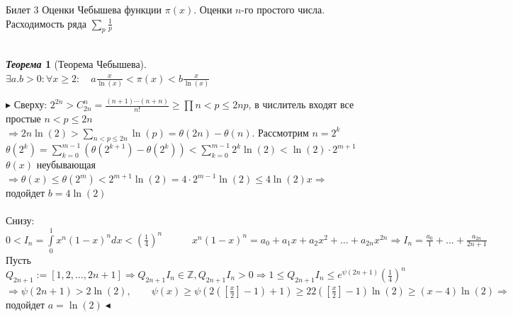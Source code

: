 \documentclass[a4paper,12pt]{article}
\newtheorem{teo}{\textit{Теорема}}
\newcommand{\TE}{\theta}
\newcommand{\SI}{\psi}
\newcommand{\q}{\quad}
\newcommand{\pb}{\blacktriangleright}
\newcommand{\pe}{\blacktriangleleft}
\newcommand{\Ra}{\Rightarrow}
\newcommand{\bb}[1]{\mathbb{#1}}
\newcommand{\SL}{\sum\limits}
\newcommand{\IL}{\int\limits}
\newcommand{\os}{\left(}
\newcommand{\cs}{\right)}
\begin{document}
\newpage
\begin{mybox}{\hypertarget{bil3}{Билет 3}}
Оценки Чебышева функции $\pi(x)$. Оценки $n$-го простого числа. Расходимость ряда $\sum_p \frac{1}{p}$\q\\\q\\
\begin{teo}[Теорема Чебышева]\q\\
$\exists a.b > 0: \forall x \ge 2:\q a\frac{x}{\ln(x)} <\pi(x) <b\frac{x}{\ln(x)} $
\end{teo}
$\pb$ Сверху: $2^{2n} > C_{2n}^n = \frac{(n+1)\cdots(n+n)}{n!}\ge \prod\limits{n<p\le 2n} p $, в числитель входят все простые $n < p \le 2n$\\
$\Ra 2n\ln(2) > \SL_{n < p \le 2n}\ln(p) = \TE(2n) - \TE(n) $. Рассмотрим $n = 2^k$\\
$\TE(2^k) = \SL_{k=0}^{m-1} (\TE(2^{k+1}) - \TE(2^k)) < \SL_{k=0}^{m-1} 2^k\ln(2) < \ln(2)  \cdot 2^{m+1}  $\\
$\TE(x)$ неубывающая $\Ra \TE(x) \le \TE(2^m)< 2^{m+1} \ln(2) = 4 \cdot 2^{m-1}\ln(2) \le 4\ln(2)x\Ra  $ подойдет $b = 4\ln(2)$\\\q\\
Снизу:$0 < I_n = \IL_0^1 x^n(1-x)^n dx< \os \frac{1}{4} \cs^n\q\q\q x^n(1-x)^n = a_0 + a_1x + a_2x^2 +\dots +a_{2n}x^{2n}\Ra I_n = \frac{a_0}{1} + \dots + \frac{a_{2n}}{2n+1}  $\\
Пусть $Q_{2n+1} := [1,2,\dots, 2n+1]\Ra Q_{2n+1}I_n\in \bb{Z}  , Q_{2n+1}I_n > 0\Ra 1 \le  Q_{2n+1}I_n \le  e^{\SI(2n+1)}  \os \frac{1}{4} \cs^n    $\\
$\Ra  \SI(2n+1) >2\ln(2), \q\q \SI(x)\ge \SI(2(\left[\frac{x}{2}\right] - 1) + 1)\ge 2 2(\left[\frac{x}{2}\right] - 1)\ln(2) \ge (x-4)\ln(2)\Ra $ подойдет $a = \ln(2)\pe$


\end{mybox}
\end{document}
